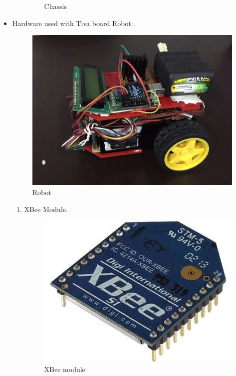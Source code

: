 \documentclass[a4paper,12pt,oneside]{book}
\begin{document}
\begin{itemize}
\begin{enumerate}
\begin{figure}[!h]
        \caption{Chassis}
      \end{figure}
      \newpage
  \end{enumerate}
  \item Hardware used with Tiva board Robot:
   \begin{figure}[!ht]
        \centering
        \includegraphics[scale=0.13]{robot}
        \caption{Robot}
      \end{figure}
  \begin{enumerate}
    \item XBee Module.
     \begin{figure}[!h]
        \centering
        \includegraphics[scale=0.2]{XBee.jpg}
        \caption{XBee module}
      \end{figure}

\end{enumerate}
\end{itemize}
\end{document}
